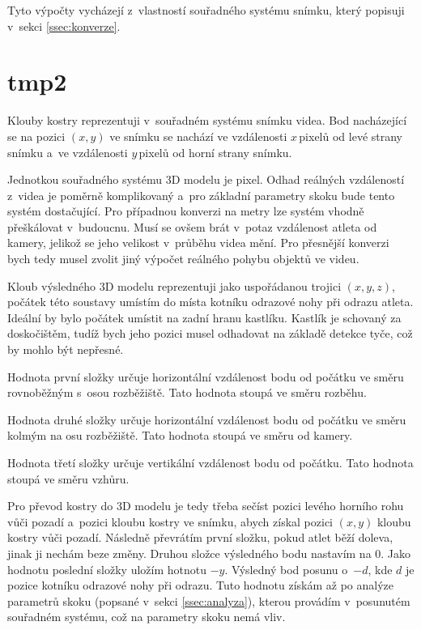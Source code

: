 Tyto výpočty vycházejí z~vlastností souřadného systému snímku, který popisuji v~sekci \ref{ssec:konverze}.

\section{tmp2}

Klouby kostry reprezentuji v~souřadném systému snímku videa. Bod nacházející se na pozici $(x,y)$ ve snímku se nachází ve vzdálenosti $x$\,\rm pixelů od levé strany snímku a~ve vzdálenosti $y$\,\rm pixelů od horní strany snímku.

Jednotkou souřadného systému 3D modelu je pixel. Odhad reálných vzdáleností z~videa je poměrně komplikovaný a~pro základní parametry skoku bude tento systém dostačující. Pro případnou konverzi na metry lze systém vhodně přeškálovat v~budoucnu. Musí se ovšem brát v~potaz vzdálenost atleta od kamery, jelikož se jeho velikost v~průběhu videa mění. Pro přesnější konverzi bych tedy musel zvolit jiný výpočet reálného pohybu objektů ve videu.

Kloub výsledného 3D modelu reprezentuji jako uspořádanou trojici $(x,y,z)$, počátek této soustavy umístím do místa kotníku odrazové nohy při odrazu atleta. Ideální by bylo počátek umístit na zadní hranu kastlíku. Kastlík je schovaný za doskočištěm, tudíž bych jeho pozici musel odhadovat na základě detekce tyče, což by mohlo být nepřesné.

Hodnota první složky určuje horizontální vzdálenost bodu od počátku ve směru rovnoběžným s~osou rozběžiště. Tato hodnota stoupá ve směru rozběhu.

Hodnota druhé složky určuje horizontální vzdálenost bodu od počátku ve směru kolmým na osu rozběžiště. Tato hodnota stoupá ve směru od kamery.

Hodnota třetí složky určuje vertikální vzdálenost bodu od počátku. Tato hodnota stoupá ve směru vzhůru.

Pro převod kostry do 3D modelu je tedy třeba sečíst pozici levého horního rohu vůči pozadí a~pozici kloubu kostry ve snímku, abych získal pozici $(x,y)$ kloubu kostry vůči pozadí. Následně převrátím první složku, pokud atlet běží doleva, jinak ji nechám beze změny. Druhou složce výsledného bodu nastavím na $0$. Jako hodnotu poslední složky uložím hotnotu $-y$. Výsledný bod posunu o~$-d$, kde $d$ je pozice kotníku odrazové nohy při odrazu. Tuto hodnotu získám až po analýze parametrů skoku (popsané v~sekci \ref{ssec:analyza}), kterou provádím v~posunutém souřadném systému, což na parametry skoku nemá vliv.

